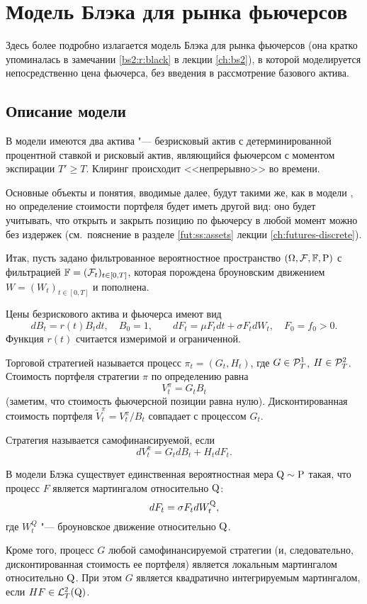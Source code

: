 \chapter{Модель Блэка для рынка фьючерсов}
\label{ch:black}

Здесь более подробно излагается модель Блэка для рынка фьючерсов (она кратко упоминалась в замечании \ref{bs2:r:black} в лекции \ref{ch:bs2}), в которой моделируется непосредственно цена фьючерса, без введения в рассмотрение базового актива.

\section{Описание модели}
В модели имеются два актива "--- безрисковый актив с детерминированной процентной ставкой и рисковый актив, являющийся фьючерсом с моментом экспирации $T'\ge T$.
Клиринг происходит <<непрерывно>> во времени.

Основные объекты и понятия, вводимые далее, будут такими же, как в модели \bs, но определение стоимости портфеля будет иметь другой вид: оно будет учитывать, что открыть и закрыть позицию по фьючерсу в любой момент можно без издержек (см.~пояснение в разделе \ref{fut:ss:assets} лекции \ref{ch:futures-discrete}).

Итак, пусть задано фильтрованное вероятностное пространство $(\Omega,\mathcal{F},\mathbb{F},\mathrm{P})$ с фильтрацией $\mathbb{F}=(\mathcal{F}_t)_{t\in[0,T]}$, которая порождена броуновским движением $W=(W_t)_{t\in[0,T]}$ и пополнена.

Цены безрискового актива и фьючерса имеют вид
\[
d B_t = r(t) B_t dt,\quad B_0=1, \qquad d F_t = \mu F_t dt + \sigma F_t dW_t, \quad F_0 = f_0>0.
\]
Функция $r(t)$ считается измеримой и ограниченной.

Торговой стратегией называется процесс $\pi_t=(G_t,H_t)$, где $G\in \mathcal{P}_T^1$, $H\in\mathcal{P}_T^2$.
Стоимость портфеля стратегии $\pi$ по определению равна
\begin{equation}
\label{bl:portfolio-value}
V_t^\pi = G_tB_t
\end{equation}
(заметим, что стоимость фьючерсной позиции равна нулю). 
Дисконтированная стоимость портфеля $\tilde V_t^\pi = V_t^\pi/B_t$ совпадает с процессом $G_t$.

Стратегия называется самофинансируемой, если
\begin{equation}
\label{bl:sf}
d V_t^\pi = G_t d B_t + H_t dF_t.
\end{equation}

\begin{proposition}
В модели Блэка существует единственная вероятностная мера $\mathrm{Q}\sim\mathrm{P}$ такая, что процесс $F$ является мартингалом относительно $\mathrm{Q}$:
\[
d F_t = \sigma F_t d W_t^{\mathrm{Q}},
\] 
где $W_t^Q$ "--- броуновское движение относительно $\mathrm{Q}$. 

Кроме того, процесс $G$ любой самофинансируемой стратегии (и, следовательно, дисконтированная стоимость ее портфеля) является локальным мартингалом относительно $\mathrm{Q}$.
При этом $G$ является квадратично интегрируемым мартингалом, если $HF\in \mathcal{L}^2_T(\mathrm{Q})$.
\end{proposition}

